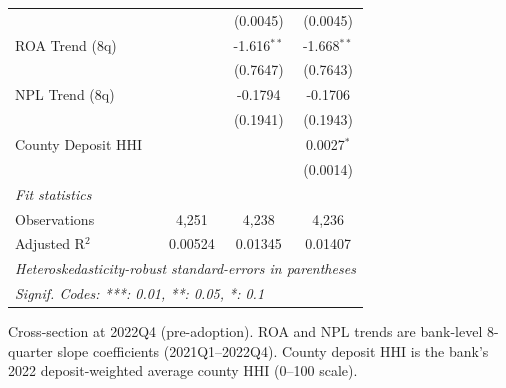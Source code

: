 \begin{tabular}{lccc}
                                     &                & (0.0045)        & (0.0045)\\   
   ROA Trend (8q)                    &                & -1.616$^{**}$   & -1.668$^{**}$\\   
                                     &                & (0.7647)        & (0.7643)\\   
   NPL Trend (8q)                    &                & -0.1794         & -0.1706\\   
                                     &                & (0.1941)        & (0.1943)\\   
   County Deposit HHI                &                &                 & 0.0027$^{*}$\\   
                                     &                &                 & (0.0014)\\   
   \midrule
   \emph{Fit statistics}\\
   Observations                      & 4,251          & 4,238           & 4,236\\  
   Adjusted R$^2$                    & 0.00524        & 0.01345         & 0.01407\\  
   \midrule \midrule
   \multicolumn{4}{l}{\emph{Heteroskedasticity-robust standard-errors in parentheses}}\\
   \multicolumn{4}{l}{\emph{Signif. Codes: ***: 0.01, **: 0.05, *: 0.1}}\\
\end{tabular}
 
\par \raggedright 
Cross-section at 2022Q4 (pre-adoption). ROA and NPL trends are bank-level 8-quarter slope coefficients (2021Q1--2022Q4). County deposit HHI is the bank's 2022 deposit-weighted average county HHI (0--100 scale).
\par\endgroup


